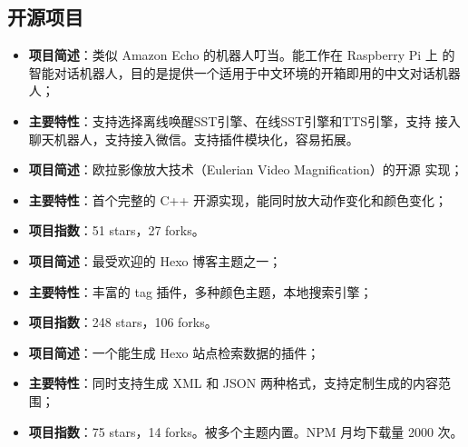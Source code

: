 \documentclass[11pt,a4paper,nolmodern]{moderncv}
\begin{document}
\subsection{\hei 开源项目}

%
  {
\begin{itemize}
\item \textbf{项目简述}：类似 Amazon Echo 的机器人叮当。能工作在 Raspberry Pi 上
  的智能对话机器人，目的是提供一个适用于中文环境的开箱即用的中文对话机器人；
\item \textbf{主要特性}：支持选择离线唤醒SST引擎、在线SST引擎和TTS引擎，支持
  接入聊天机器人，支持接入微信。支持插件模块化，容易拓展。
\end{itemize}}

%
  {
\begin{itemize}
\item \textbf{项目简述}：欧拉影像放大技术（Eulerian Video Magnification）的开源
  实现；
\item \textbf{主要特性}：首个完整的 C++ 开源实现，能同时放大动作变化和颜色变化；
\item \textbf{项目指数}：51 stars，27 forks。
\end{itemize}}

%
  {
\begin{itemize}
\item \textbf{项目简述}：最受欢迎的 Hexo 博客主题之一；
\item \textbf{主要特性}：丰富的 tag 插件，多种颜色主题，本地搜索引擎；
\item \textbf{项目指数}：248 stars，106 forks。
\end{itemize}}

%
  {
\begin{itemize}
\item \textbf{项目简述}：一个能生成 Hexo 站点检索数据的插件；
\item \textbf{主要特性}：同时支持生成 XML 和
  JSON 两种格式，支持定制生成的内容范围；
\item \textbf{项目指数}：75 stars，14 forks。被多个主题内置。NPM 月均下载量 2000 次。
\end{itemize}}
\end{document}
